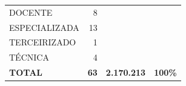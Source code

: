 \documentclass{article}
\begin{document}
\begin{longtable}[c]{m{7cm}|m{2.5cm}|m{2.5cm}|m{2.5cm}}
\multicolumn{1}{L{7cm}|}{ \hspace{3em} DOCENTE} & \multicolumn{1}{r|}{ 8} &  & \\
\multicolumn{1}{L{7cm}|}{ \hspace{3em} ESPECIALIZADA} & \multicolumn{1}{r|}{ 13} &  & \\
\multicolumn{1}{L{7cm}|}{ \hspace{3em} TERCEIRIZADO} & \multicolumn{1}{r|}{ 1} &  & \\
\multicolumn{1}{L{7cm}|}{ \hspace{3em} TÉCNICA} & \multicolumn{1}{r|}{ 4} &  & \\
\hline \hline 
\multicolumn{1}{L{7cm}|}{ \textbf{TOTAL}} & \multicolumn{1}{r|}{ \textbf{63}} & \multicolumn{1}{r|}{ \textbf{2.170.213}} & \multicolumn{1}{r}{ \textbf{100\%}} \\
\end{longtable}
\newpage
\small
\end{document}
